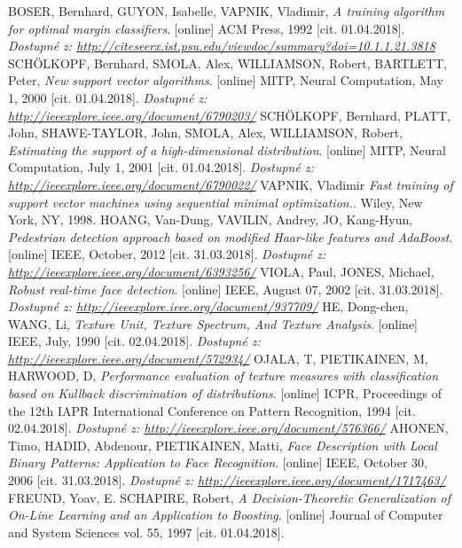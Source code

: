 \begin{thebibliography}{99}
	 BOSER, Bernhard, GUYON, Isabelle, VAPNIK, Vladimir, \textit{A training algorithm for optimal margin classifiers}. [online] ACM Press, 1992 [cit. 01.04.2018]. 
 	\textit{Dostupné z: \url{http://citeseerx.ist.psu.edu/viewdoc/summary?doi=10.1.1.21.3818}}
 	 SCHÖLKOPF, Bernhard, SMOLA, Alex, WILLIAMSON, Robert, BARTLETT, Peter, \textit{New support vector algorithms}. [online] MITP, Neural Computation, May 1, 2000 [cit. 01.04.2018]. 
 	\textit{Dostupné z: \url{http://ieeexplore.ieee.org/document/6790203/}}
 	 SCHÖLKOPF, Bernhard, PLATT, John, SHAWE-TAYLOR, John, SMOLA, Alex, WILLIAMSON, Robert, \textit{Estimating the support of a high-dimensional distribution}. [online] MITP, Neural Computation, July 1, 2001 [cit. 01.04.2018]. 
 	\textit{Dostupné z: \url{http://ieeexplore.ieee.org/document/6790022/}}
 	 VAPNIK, Vladimir \textit{Fast training of support vector machines using sequential minimal optimization.}. Wiley, New York, NY, 1998. 
 	 HOANG, Van-Dung, VAVILIN, Andrey, JO, Kang-Hyun, \textit{Pedestrian detection approach based on modified Haar-like features and AdaBoost}. [online] IEEE, October, 2012 [cit. 31.03.2018]. 
 		\textit{Dostupné z: \url{http://ieeexplore.ieee.org/document/6393256/}}
 	 VIOLA, Paul, JONES, Michael, \textit{Robust real-time face detection}. [online] IEEE, August 07, 2002 [cit. 31.03.2018]. 
 		\textit{Dostupné z: \url{http://ieeexplore.ieee.org/document/937709/}}
 	 HE, Dong-chen, WANG, Li, \textit{Texture Unit, Texture Spectrum, And Texture Analysis}. [online] IEEE, July, 1990 [cit. 02.04.2018]. 
 		\textit{Dostupné z: \url{http://ieeexplore.ieee.org/document/572934/}}
 	 OJALA, T, PIETIKAINEN, M, HARWOOD, D, \textit{Performance evaluation of texture measures with classification based on Kullback discrimination of distributions}. [online] ICPR, Proceedings of the 12th IAPR International Conference on Pattern Recognition, 1994 [cit. 02.04.2018]. 
 		\textit{Dostupné z: \url{http://ieeexplore.ieee.org/document/576366/}}
	 AHONEN, Timo, HADID, Abdenour, PIETIKAINEN, Matti, \textit{Face Description with Local Binary Patterns: Application to Face Recognition}. [online] IEEE, October 30, 2006 [cit. 31.03.2018]. 
 		\textit{Dostupné z: \url{http://ieeexplore.ieee.org/document/1717463/}}
 	 FREUND, Yoav, E. SCHAPIRE, Robert, \textit{A Decision-Theoretic Generalization of On-Line Learning and an Application to Boosting}. [online] Journal of Computer and System Sciences vol. 55, 1997 [cit. 01.04.2018]. 

\end{thebibliography}
